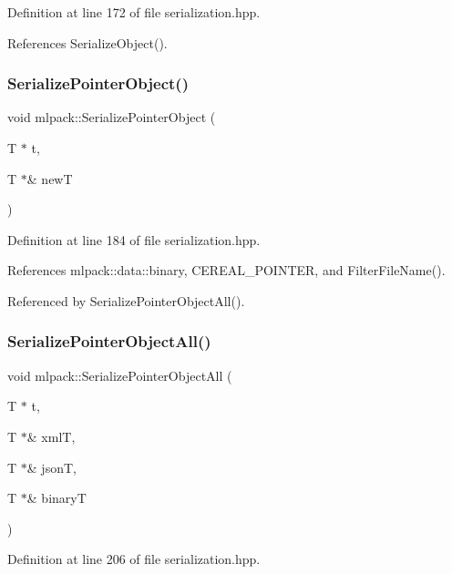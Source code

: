 Definition at line 172 of file serialization.\+hpp.



References Serialize\+Object().

\mbox{\label{namespacemlpack_a4aa2fa900138dc71a37b9b3922d6faff}} 
\subsubsection{Serialize\+Pointer\+Object()}
{\footnotesize\ttfamily void mlpack\+::\+Serialize\+Pointer\+Object (\begin{DoxyParamCaption}\item[{T $\ast$}]{t,  }\item[{T $\ast$\&}]{newT }\end{DoxyParamCaption})}



Definition at line 184 of file serialization.\+hpp.



References mlpack\+::data\+::binary, C\+E\+R\+E\+A\+L\+\_\+\+P\+O\+I\+N\+T\+ER, and Filter\+File\+Name().



Referenced by Serialize\+Pointer\+Object\+All().

\mbox{\label{namespacemlpack_a005e4f612a7747ec26149ceb00fbb960}} 
\subsubsection{Serialize\+Pointer\+Object\+All()}
{\footnotesize\ttfamily void mlpack\+::\+Serialize\+Pointer\+Object\+All (\begin{DoxyParamCaption}\item[{T $\ast$}]{t,  }\item[{T $\ast$\&}]{xmlT,  }\item[{T $\ast$\&}]{jsonT,  }\item[{T $\ast$\&}]{binaryT }\end{DoxyParamCaption})}



Definition at line 206 of file serialization.\+hpp.



